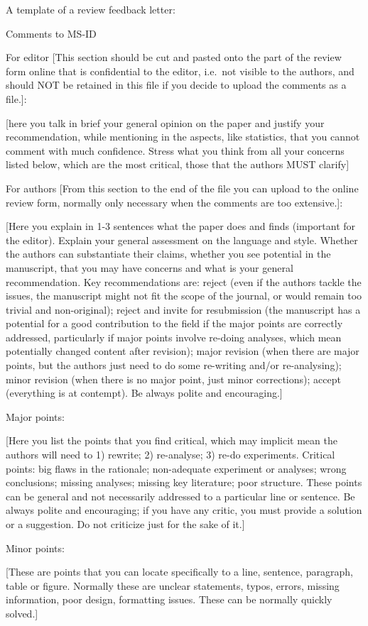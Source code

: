 \documentclass[
]{book}
\begin{document}
A template of a review feedback letter:

Comments to MS-ID

For editor {[}This section should be cut and pasted onto the part of the
review form online that is confidential to the editor, i.e.~not visible
to the authors, and should NOT be retained in this file if you decide to
upload the comments as a file.{]}:

{[}here you talk in brief your general opinion on the paper and justify
your recommendation, while mentioning in the aspects, like statistics,
that you cannot comment with much confidence. Stress what you think from
all your concerns listed below, which are the most critical, those that
the authors MUST clarify{]}

For authors {[}From this section to the end of the file you can upload to
the online review form, normally only necessary when the comments are
too extensive.{]}:

{[}Here you explain in 1-3 sentences what the paper does and finds
(important for the editor). Explain your general assessment on the
language and style. Whether the authors can substantiate their claims,
whether you see potential in the manuscript, that you may have concerns
and what is your general recommendation. Key recommendations are: reject
(even if the authors tackle the issues, the manuscript might not fit the
scope of the journal, or would remain too trivial and non-original);
reject and invite for resubmission (the manuscript has a potential for a
good contribution to the field if the major points are correctly
addressed, particularly if major points involve re-doing analyses, which
mean potentially changed content after revision); major revision (when
there are major points, but the authors just need to do some re-writing
and/or re-analysing); minor revision (when there is no major point, just
minor corrections); accept (everything is at contempt). Be always polite
and encouraging.{]}

Major points:

{[}Here you list the points that you find critical, which may implicit
mean the authors will need to 1) rewrite; 2) re-analyse; 3) re-do
experiments. Critical points: big flaws in the rationale; non-adequate
experiment or analyses; wrong conclusions; missing analyses; missing key
literature; poor structure. These points can be general and not
necessarily addressed to a particular line or sentence. Be always polite
and encouraging; if you have any critic, you must provide a solution or
a suggestion. Do not criticize just for the sake of it.{]}

Minor points:

{[}These are points that you can locate specifically to a line, sentence,
paragraph, table or figure. Normally these are unclear statements,
typos, errors, missing information, poor design, formatting issues.
These can be normally quickly solved.{]}


\end{document}
